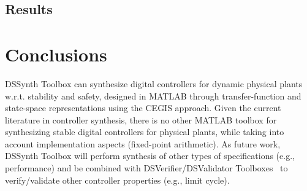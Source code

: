 \documentclass[10pt,conference]{IEEEtran}
\newcommand\tool{{DSSynth Toolbox}\xspace}
\begin{document}
\subsection{Results}


\section{Conclusions}

\tool can synthesize digital controllers for dynamic physical plants 
w.r.t. stability and safety, designed in MATLAB through transfer-function 
and state-space representations using the CEGIS approach.
%
Given the current literature in controller synthesis, there is no other MATLAB toolbox 
for synthesizing stable digital controllers for physical plants, while taking into account implementation 
aspects (fixed-point arithmetic). 
%
As future work, \tool will perform synthesis of other types of specifications (e.g., performance) 
and be combined with DSVerifier/DSValidator Toolboxes~\cite{issta2017,dsvalidator} to verify/validate
 other controller properties (e.g., limit cycle). 


 
\end{document}
